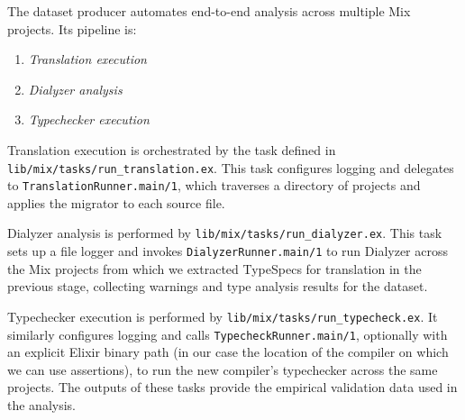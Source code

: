 The dataset producer automates end-to-end analysis across multiple Mix projects.
Its pipeline is:
\begin{enumerate}
    \item \textit{Translation execution}
    \item \textit{Dialyzer analysis}
    \item \textit{Typechecker execution}
\end{enumerate}

Translation execution is orchestrated by the task defined in \texttt{lib/mix/tasks/run\_translation.ex}.
This task configures logging and delegates to \texttt{TranslationRunner.main/1}, which traverses a directory of projects and applies the migrator to each source file.

Dialyzer analysis is performed by \texttt{lib/mix/tasks/run\_dialyzer.ex}.
This task sets up a file logger and invokes \texttt{DialyzerRunner.main/1} to run Dialyzer across the Mix projects from which we extracted TypeSpecs for translation in the previous stage, collecting warnings and type analysis results for the dataset.

Typechecker execution is performed by \texttt{lib/mix/tasks/run\_typecheck.ex}.
It similarly configures logging and calls \texttt{TypecheckRunner.main/1}, optionally with an explicit Elixir binary path (in our case the location of the compiler on which we can use assertions), to run the new compiler's typechecker across the same projects.
The outputs of these tasks provide the empirical validation data used in the analysis.





